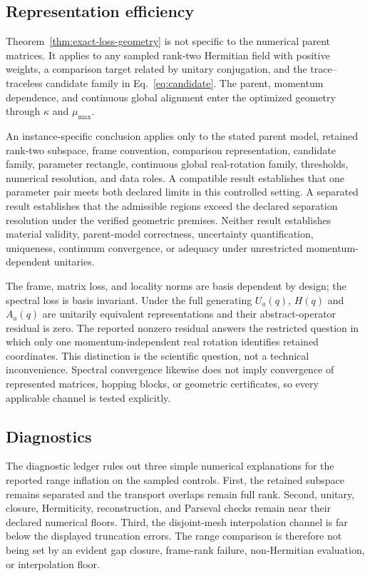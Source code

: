 \documentclass[aps,prb,reprint,amsmath,amssymb,longbibliography,floatfix]{revtex4-2}
\begin{document}
\subsection{Representation efficiency}

Theorem~\ref{thm:exact-loss-geometry} is not specific to the numerical parent matrices.
It applies to any sampled rank-two Hermitian field with positive weights, a comparison
target related by unitary conjugation, and the trace--traceless candidate family in
Eq.~\eqref{eq:candidate}. The parent, momentum dependence, and continuous global
alignment enter the optimized geometry through $\kappa$ and $\mu_{\max}$.

An instance-specific conclusion applies only to the stated parent model, retained
rank-two subspace, frame convention, comparison representation, candidate family,
parameter rectangle, continuous global real-rotation family, thresholds, numerical
resolution, and data roles. A compatible result establishes that one parameter pair
meets both declared limits in this controlled setting. A separated result establishes
that the admissible regions exceed the declared separation resolution under the verified
geometric premises. Neither result establishes material validity, parent-model
correctness, uncertainty quantification, uniqueness, continuum convergence, or adequacy
under unrestricted momentum-dependent unitaries.

The frame, matrix loss, and locality norms are basis dependent by design; the spectral
loss is basis invariant. Under the full generating $U_a(q)$, $H(q)$ and $A_a(q)$ are
unitarily equivalent representations and their abstract-operator residual is zero. The
reported nonzero residual answers the restricted question in which only one
momentum-independent real rotation identifies retained coordinates. This distinction is
the scientific question, not a technical inconvenience. Spectral convergence likewise
does not imply convergence of represented matrices, hopping blocks, or geometric
certificates, so every applicable channel is tested explicitly.

\subsection{Diagnostics}

The diagnostic ledger rules out three simple numerical explanations for the reported
range inflation on the sampled controls. First, the retained subspace remains separated
and the transport overlaps remain full rank. Second, unitary, closure, Hermiticity,
reconstruction, and Parseval checks remain near their declared numerical floors. Third,
the disjoint-mesh interpolation channel is far below the displayed truncation errors.
The range comparison is therefore not being set by an evident gap closure, frame-rank
failure, non-Hermitian evaluation, or interpolation floor.
\end{document}
